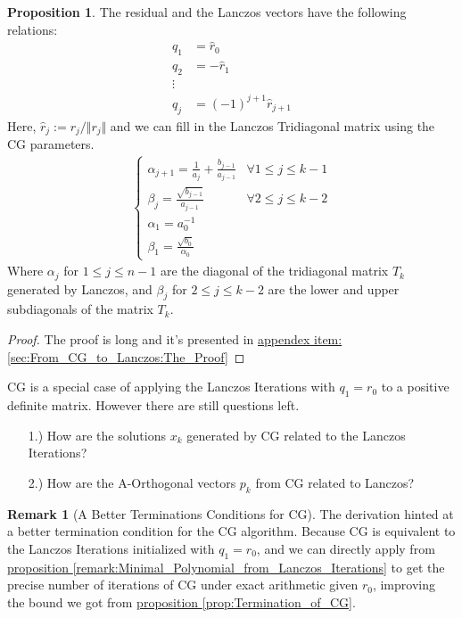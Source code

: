 \documentclass[]{article}
\theoremstyle{definition}
\newtheorem{prop}{Proposition}[section]  %
\newtheorem{remark}{Remark}[subsection]  %
\begin{document}
        \begin{prop}
            The residual and the Lanczos vectors have the following relations: 
            \begin{align}
                q_1 &= \hat r_0\\
                q_2 &= -\hat r_1
                \\
                \vdots
                \\
                q_j &= (-1)^{j + 1}\hat r_{j + 1}
            \end{align}
            Here, $\hat{r}_j:= r_j/\Vert r_j\Vert$ and we can fill in the Lanczos Tridiagonal matrix using the CG parameters. 
            \begin{align}
                \begin{cases}
                    \alpha_{j + 1} = \frac{1}{a_j} + \frac{b_{j - 1}}{a_{j - 1}}
                    & \forall 1 \le j \le k - 1
                    \\
                    \beta_{j} = \frac{\sqrt{b_{j - 1}}}{a_{j - 1}}
                    & \forall 2 \le j \le k - 2 
                    \\
                    \alpha_1 = a_0^{-1} & 
                    \\
                    \beta_1 = \frac{\sqrt{b_0}}{\alpha_0}
                \end{cases}
            \end{align}
            Where $\alpha_j$ for $1\le j \le n - 1$ are the diagonal of the tridiagonal matrix $T_k$ generated by Lanczos, and $\beta_j$ for $2\le j \le k - 2$ are the lower and upper subdiagonals of the matrix $T_k$. 
        \end{prop}
        \begin{proof}
            The proof is long and it's presented in \hyperref[sec:From_CG_to_Lanczos:The_Proof]{appendex item: \ref*{sec:From_CG_to_Lanczos:The_Proof}}
        \end{proof}
        CG is a special case of applying the Lanczos Iterations with $q_1 = r_0$ to a positive definite matrix. However there are still questions left. 
            \begin{enumerate}
                \item [1.)] How are the solutions $x_k$ generated by CG related to the Lanczos Iterations? 
                \item [2.)] How are the A-Orthogonal vectors $p_k$ from CG related to Lanczos?
            \end{enumerate}
        \begin{remark}[A Better Terminations Conditions for CG]
                The derivation hinted at a better termination condition for the CG algorithm. Because CG is equivalent to the Lanczos Iterations initialized with $q_1 = r_0$, and we can directly apply from \hyperref[remark:Minimal_Polynomial_from_Lanczos_Iterations]{proposition \ref*{remark:Minimal_Polynomial_from_Lanczos_Iterations}} to get the precise number of iterations of CG under exact arithmetic given $r_0$, improving the bound we got from \hyperref[prop:Termination_of_CG]{proposition \ref*{prop:Termination_of_CG}}.
            \end{remark}
\end{document}
